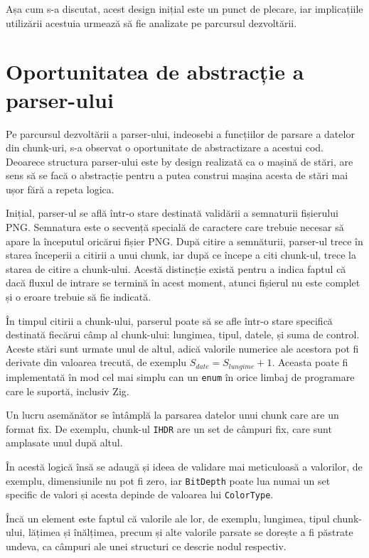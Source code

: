 \documentclass[a4paper,12pt]{report}
\begin{document}
Așa cum s-a discutat, acest design inițial este un punct de plecare,
iar implicațiile utilizării acestuia urmează să fie analizate pe parcursul dezvoltării.


\section{Oportunitatea de abstracție a parser-ului}

Pe parcursul dezvoltării a parser-ului, indeosebi a funcțiilor de parsare a datelor din chunk-uri,
s-a observat o oportunitate de abstractizare a acestui cod.
Deoarece structura parser-ului este by design realizată ca o mașină de stări,
are sens să se facă o abstracție pentru a putea construi mașina acesta de stări mai ușor
fără a repeta logica.

Inițial, parser-ul se află într-o stare destinată validării a semnaturii fișierului \ac{PNG}.
Semnatura este o secvență specială de caractere care 
trebuie necesar să apare la începutul oricărui fișier \ac{PNG}.
După citire a semnăturii, parser-ul trece în starea începerii a citirii a unui chunk,
iar după ce începe a citi chunk-ul, trece la starea de citire a chunk-ului.
Acestă distincție există pentru a indica faptul că dacă fluxul de intrare
se termină în acest moment, atunci fișierul nu este complet și 
o eroare trebuie să fie indicată.

În timpul citirii a chunk-ului, parserul poate să se afle 
într-o stare specifică destinată fiecărui câmp al chunk-ului:
lungimea, tipul, datele, și suma de control.
Aceste stări sunt urmate unul de altul, adică valorile numerice
ale acestora pot fi derivate din valoarea trecută, de exemplu 
$ S_{date} = S_{lungime} + 1. $
Aceasta poate fi implementată în mod cel mai simplu can un \texttt{enum}
în orice limbaj de programare care le suportă, inclusiv Zig.

Un lucru asemănător se întâmplă la parsarea datelor unui chunk care are un format fix.
De exemplu, chunk-ul \texttt{IHDR} are un set de câmpuri fix, care sunt amplasate unul după altul.

În acestă logică însă se adaugă și ideea de validare mai meticuloasă a valorilor,
de exemplu, dimensiunile nu pot fi zero, iar \texttt{BitDepth} poate lua numai un set specific de valori
și acesta depinde de valoarea lui \texttt{ColorType}.

Încă un element este faptul că valorile ale lor, de exemplu, lungimea, tipul chunk-ului,
lățimea și înălțimea, precum și alte valorile parsate se dorește a fi păstrate undeva,
ca câmpuri ale unei structuri ce descrie nodul respectiv.
\end{document}
